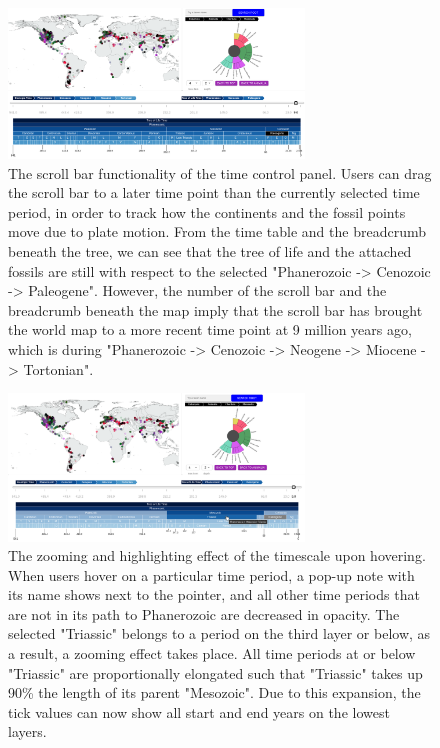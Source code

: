 \documentclass[11pt, a4paper,oneside,chapterprefix=false]{scrbook}
\begin{document}
\begin{figure}[h!]
	\centering
	\includegraphics[width=0.7\textwidth]{figures/technical_solution/time_control/time_point}
	\caption{The scroll bar functionality of the time control panel. Users can drag the scroll bar to a later time point than the currently selected time period, in order to track how the continents and the fossil points move due to plate motion. From the time table and the breadcrumb beneath the tree, we can see that the tree of life and the attached fossils are still with respect to the selected "Phanerozoic -> Cenozoic -> Paleogene". However, the number of the scroll bar and the breadcrumb beneath the map imply that the scroll bar has brought the world map to a more recent time point at 9 million years ago, which is during "Phanerozoic -> Cenozoic -> Neogene -> Miocene -> Tortonian".}
	\label{fig:time_control_point}
\end{figure}

\begin{figure}[h]
	\centering
	\includegraphics[width=0.7\textwidth]{figures/technical_solution/time_control/time_hover}
	\caption{The zooming and highlighting effect of the timescale upon hovering. When users hover on a particular time period, a pop-up note with its name shows next to the pointer, and all other time periods that are not in its path to Phanerozoic are decreased in opacity. The selected "Triassic" belongs to a period on the third layer or below, as a result, a zooming effect takes place. All time periods at or below "Triassic" are proportionally elongated such that "Triassic" takes up 90\% the length of its parent "Mesozoic". Due to this expansion, the tick values can now show all start and end years on the lowest layers. }
	\label{fig:time_control_hover}
\end{figure}
\end{document}
